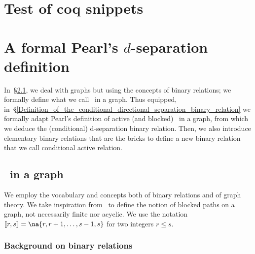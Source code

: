 \documentclass[12pt]{article}
\def\citep#1{\cite{#1}}
\begin{document}
\section{Test of coq snippets}


\section{A formal Pearl's $d$-separation definition}
\label{Conditional_active_relation_induced_by_endpoints_of_non-blocking_paths}

In~\S\ref{UndirectedEdgePaths_in_a_graph}, we deal with
graphs but using the concepts of binary relations;
we formally define what we call \undirectedEdgePaths\ in a graph.
Thus equipped, in~\S\ref{Definition_of_the_conditional_directional_separation_binary_relation}
we formally adapt Pearl's definition of active (and blocked)
\undirectedEdgePaths\ in a graph,
from which we deduce the (conditional) d-separation binary relation.
Then, we also introduce elementary binary relations that are the bricks
to define a new binary relation that we call conditional active relation.

\subsection{\UndirectedEdgePaths\ in a graph}
\label{UndirectedEdgePaths_in_a_graph}

We employ the vocabulary and concepts both of binary relations and of graph theory.
% 
We take inspiration from~\citep{PEARL1986357} to define the notion of blocked paths
on a graph, not necessarily finite nor acyclic.
% 
We use the notation \( \ic{r,s}=\na{r,r+1,\ldots,s-1,s} \) for two integers $r \leq s$.

\subsubsection{Background on binary relations}
\end{document}
